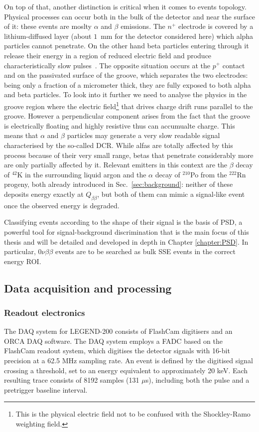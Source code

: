 On top of that, another distinction is critical when it comes to events topology. Physical processes can occur both in the bulk of the detector and near the surface of it: these events are moslty $\alpha$ and $\beta$ emissions. The $n^+$ electrode is covered by a lithium-diffused layer (about $1$~mm for the detector considered here) which alpha particles cannot penetrate. On the other hand beta particles entering through it release their energy in a region of reduced electric field and produce characteristically slow pulses~\cite{L1000-design}. The opposite situation occurs at the $p^+$ contact and on the passivated surface of the groove, which separates the two electrodes: being only a fraction of a micrometer thick, they are fully exposed to both alpha and beta particles. To look into it further we need to analyse the physics in the groove region where the electric field\footnote{This is the physical electric field not to be confused with the Shockley-Ramo weighting field.} that drives charge drift runs parallel to the groove. However a perpendicular component arises from the fact that the groove is electrically floating and highly resistive thus can accumualte charge. This means that $\alpha$ and $\beta$ particles may generate a very slow readable signal characterised by the so-called \ac{DCR}. While alfas are totally affected by this process because of their very small range, betas that penetrate considerably more are only partially affected by it. Relevant emitters in this context are the $\beta$ decay of $^{42}$K in the surrounding liquid argon and the $\alpha$ decay of $^{210}$Po from the $^{222}$Rn progeny, both already introduced in Sec.~\ref{sec:background}: neither of these deposits energy exactly at $Q_{\beta\beta}$, but both of them can mimic a signal-like event once the observed energy is degraded. 

Classifying events according to the shape of their signal is the basis of \ac{PSD}, a powerful tool for signal-background discrimination that is the main focus of this thesis and will be detailed and developed in depth in Chapter \ref{chapter:PSD}. In particular, 0$\nu\beta\beta$ events are to be searched as bulk \ac{SSE} events in the correct energy \ac{ROI}.

\subsection{Data acquisition and processing}
\subsubsection{Readout electronics}
The \ac{DAQ} system for LEGEND-200 consists of FlashCam digitisers and an \ac{ORCA} \ac{DAQ} software. The \ac{DAQ} system employs a \ac{FADC} based on the FlashCam readout system, which digitises the detector signals with 16-bit precision at a 62.5 MHz sampling rate. An event is defined by the digitised signal crossing a threshold, set to an energy equivalent to approximately 20 keV. Each resulting trace consists of 8192 samples (131 $\mu$s), including both the pulse and a pretrigger baseline interval. \cite{LEGEND:GeDet} 

